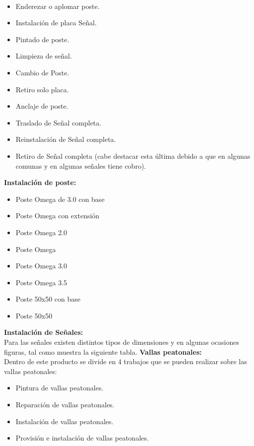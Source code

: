 	\\
	\vspace{5mm} 
	\begin{itemize}
	\item Enderezar o aplomar poste. 
	\item Instalación de placa Señal. 
	\item Pintado de poste.
	\item Limpieza de señal.
	\item Cambio de Poste.
	\item Retiro solo placa.
	\item Anclaje de poste.
	\item Traslado de Señal completa.
	\item Reinstalación de Señal completa.
	\item Retiro de Señal completa (cabe destacar esta última debido a que en algunas comunas y en algunas señales tiene cobro). 
	\end{itemize}
	
	\textbf{Instalación de poste: }\\
	\begin{itemize}
	\item Poste Omega de 3.0 con base
	\item Poste Omega con extensión
	\item Poste Omega 2.0
	\item Poste Omega
	\item Poste Omega 3.0
	\item Poste Omega 3.5
	\item Poste 50x50 con base
	\item Poste 50x50
	\end{itemize}
	\textbf{Instalación de Señales:}\\
	Para las señales existen distintos tipos de dimensiones y en algunas ocasiones figuras, tal como muestra la siguiente tabla.
	\textbf{Vallas peatonales: }\\
	Dentro de este producto se divide en 4 trabajos que se pueden realizar sobre las vallas peatonales:
	\begin{itemize}
	\item Pintura de vallas peatonales.
	\item Reparación de vallas peatonales.
	\item Instalación de vallas peatonales.
	\item Provisión e instalación de vallas peatonales.
	\end{itemize}
